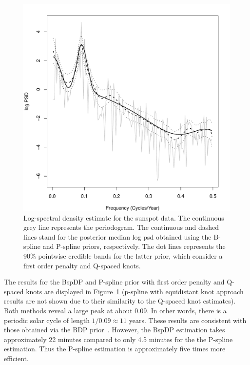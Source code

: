 \documentclass[twocolumn,final]{svjour3}
\begin{document}
\begin{figure}[]
	\centering
	\includegraphics[scale=0.40,clip=true,angle=0]{sunspot.pdf}
	\caption{Log-spectral density estimate for the sunspot data. The continuous grey line represents the periodogram.  The continuous and dashed lines stand for the posterior median log psd obtained using the B-spline and P-spline priors, respectively.  The dot lines represents the 90\% pointwise credible bands for the latter prior, which consider a first order penalty and Q-spaced knots.}
	\label{fig:sunspot}
\end{figure}


The results for the BspDP and P-spline prior  with first order penalty and Q-spaced knots are displayed in Figure~\ref{fig:sunspot} (p-spline with equidistant knot approach results are not shown due to their similarity to the Q-spaced knot estimates).  Both methods reveal a large peak at about 0.09. In other words, there is a periodic solar cycle of length $1/ 0.09 \approx 11$ years.  These results are consistent with those obtained via the BDP  prior~\citep{Choudhuri:2004}.
However, the BspDP estimation takes approximately 22 minutes compared to only 4.5 minutes for the the P-spline estimation. Thus the P-spline estimation is approximately
five times more efficient.
\end{document}
